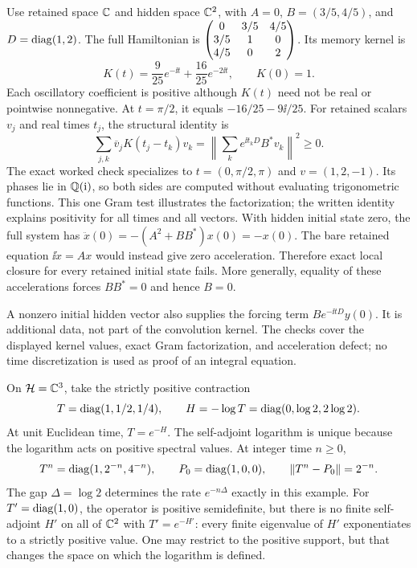 Use retained space $\CC$ and hidden space $\CC^2$, with $A=0$, $B=(3/5,4/5)$, and $D=\operatorname{diag}(1,2)$. The full Hamiltonian is $\begin{pmatrix}0&3/5&4/5\\3/5&1&0\\4/5&0&2\end{pmatrix}$. Its memory kernel is
\[
K(t)=\frac9{25}e^{-\ii t}+\frac{16}{25}e^{-2\ii t},
\qquad K(0)=1.
\]
Each oscillatory coefficient is positive although $K(t)$ need not be real or pointwise nonnegative. At $t=\pi/2$, it equals $-16/25-9\ii/25$.
For retained scalars $v_j$ and real times $t_j$, the structural identity is
\[
\sum_{j,k}\overline v_jK(t_j-t_k)v_k
=\left\|\sum_k e^{\ii t_kD}B^*v_k\right\|^2\geq0.
\]
The exact worked check specializes to $t=(0,\pi/2,\pi)$ and $v=(1,2,-1)$. Its phases lie in $\QQ(\ii)$, so both sides are computed without evaluating trigonometric functions. This one Gram test illustrates the factorization; the written identity explains positivity for all times and all vectors.
With hidden initial state zero, the full system has $\ddot x(0)=-(A^2+BB^*)x(0)=-x(0)$. The bare retained equation $\ii\dot x=Ax$ would instead give zero acceleration. Therefore exact local closure for every retained initial state fails. More generally, equality of these accelerations forces $BB^*=0$ and hence $B=0$.

A nonzero initial hidden vector also supplies the forcing term $Be^{-\ii tD}y(0)$. It is additional data, not part of the convolution kernel. The checks cover the displayed kernel values, exact Gram factorization, and acceleration defect; no time discretization is used as proof of an integral equation.

On $\HH=\CC^3$, take the strictly positive contraction
\[
T=\operatorname{diag}(1,1/2,1/4),\qquad H=-\log T=\operatorname{diag}(0,\log2,2\log2).
\]
At unit Euclidean time, $T=e^{-H}$. The self-adjoint logarithm is unique because the logarithm acts on positive spectral values. At integer time $n\geq0$,
\[
T^n=\operatorname{diag}(1,2^{-n},4^{-n}),\qquad
P_0=\operatorname{diag}(1,0,0),\qquad\left\lVert T^n-P_0\right\rVert=2^{-n}.
\]
The gap $\Delta=\log2$ determines the rate $e^{-n\Delta}$ exactly in this example.
For $T'=\operatorname{diag}(1,0)$, the operator is positive semidefinite, but there is no finite self-adjoint $H'$ on all of $\CC^2$ with $T'=e^{-H'}$: every finite eigenvalue of $H'$ exponentiates to a strictly positive value. One may restrict to the positive support, but that changes the space on which the logarithm is defined.

